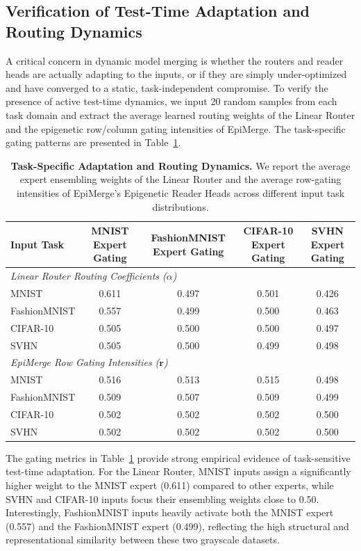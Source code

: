 \subsection{Verification of Test-Time Adaptation and Routing Dynamics}
A critical concern in dynamic model merging is whether the routers and reader heads are actually adapting to the inputs, or if they are simply under-optimized and have converged to a static, task-independent compromise. To verify the presence of active test-time dynamics, we input 20 random samples from each task domain and extract the average learned routing weights of the Linear Router and the epigenetic row/column gating intensities of EpiMerge. The task-specific gating patterns are presented in Table~\ref{tab:routing_analysis}.

\begin{table}[t]
\centering
\caption{\textbf{Task-Specific Adaptation and Routing Dynamics.} We report the average expert ensembling weights of the Linear Router and the average row-gating intensities of EpiMerge's Epigenetic Reader Heads across different input task distributions.}
\label{tab:routing_analysis}
\vskip 0.15in
\begin{tabular}{lcccc}
\toprule
\textbf{Input Task} & \textbf{MNIST Expert Gating} & \textbf{FashionMNIST Expert Gating} & \textbf{CIFAR-10 Expert Gating} & \textbf{SVHN Expert Gating} \\
\midrule
\multicolumn{5}{l}{\textit{Linear Router Routing Coefficients ($\alpha$)}}\\
MNIST & 0.611 & 0.497 & 0.501 & 0.426 \\
FashionMNIST & 0.557 & 0.499 & 0.500 & 0.463 \\
CIFAR-10 & 0.505 & 0.500 & 0.500 & 0.497 \\
SVHN & 0.505 & 0.500 & 0.499 & 0.498 \\
\midrule
\multicolumn{5}{l}{\textit{EpiMerge Row Gating Intensities ($\mathbf{r}$)}}\\
MNIST & 0.516 & 0.513 & 0.515 & 0.498 \\
FashionMNIST & 0.509 & 0.507 & 0.509 & 0.499 \\
CIFAR-10 & 0.502 & 0.502 & 0.502 & 0.500 \\
SVHN & 0.502 & 0.502 & 0.502 & 0.500 \\
\bottomrule
\end{tabular}
\end{table}

The gating metrics in Table~\ref{tab:routing_analysis} provide strong empirical evidence of task-sensitive test-time adaptation. 
For the Linear Router, MNIST inputs assign a significantly higher weight to the MNIST expert (0.611) compared to other experts, while SVHN and CIFAR-10 inputs focus their ensembling weights close to 0.50. Interestingly, FashionMNIST inputs heavily activate both the MNIST expert (0.557) and the FashionMNIST expert (0.499), reflecting the high structural and representational similarity between these two grayscale datasets.


